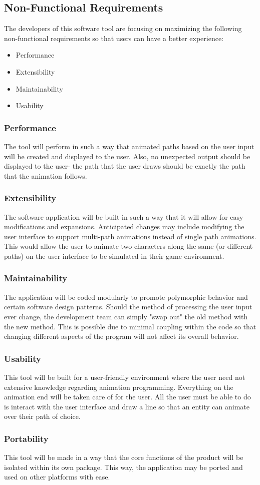 \subsection{Non-Functional Requirements}
The developers of this software tool are focusing on maximizing the following non-functional requirements so that users can have a better experience:

\begin{itemize}
 \item Performance
 \item Extensibility
 \item Maintainability
 \item Usability
\end{itemize}

\subsubsection{Performance}
The tool will perform in such a way that animated paths based on the user input will be created and displayed to the user. Also, no unexpected output should be displayed to the user- the path that the user draws should be exactly the path that the animation follows.

\subsubsection{Extensibility}
The software application will be built in such a way that it will allow for easy modifications and expansions. Anticipated changes may include modifying the user interface to support multi-path animations instead of single path animations. This would allow the user to animate two characters along the same (or different paths) on the user interface to be simulated in their game environment.

\subsubsection{Maintainability}
The application will be coded modularly to promote polymorphic behavior and certain software design patterns. Should the method of processing the user input ever change, the development team can simply "swap out" the old method with the new method. This is possible due to minimal coupling within the code so that changing different aspects of the program will not affect its overall behavior.

\subsubsection{Usability}
This tool will be built for a user-friendly environment where the user need not extensive knowledge regarding animation programming. Everything on the animation end will be taken care of for the user. All the user must be able to do is interact with the user interface and draw a line so that an entity can animate over their path of choice.

\subsubsection{Portability}
This tool will be made in a way that the core functions of the product will be isolated within its own package. This way, the application may be ported and used on other platforms with ease.

